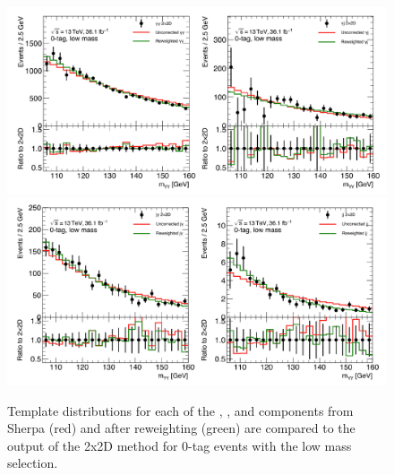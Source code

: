 \begin{figure}[!hp]
  \centering
  \includegraphics[width=\textwidth]{chapters/chapter5_yybb/images/2x2d/low_mass_1_clean.pdf}\\
  \includegraphics[width=\textwidth]{chapters/chapter5_yybb/images/2x2d/low_mass_2_clean.pdf}
  \caption{Template distributions for each of the \yy, \yj, \jy and \jj  components from Sherpa (red) and after reweighting (green) are compared to the output of the 2x2D method for 0-tag events with the low mass selection.
    \label{fig:2x2D_templates_lowMass}}
\end{figure}

